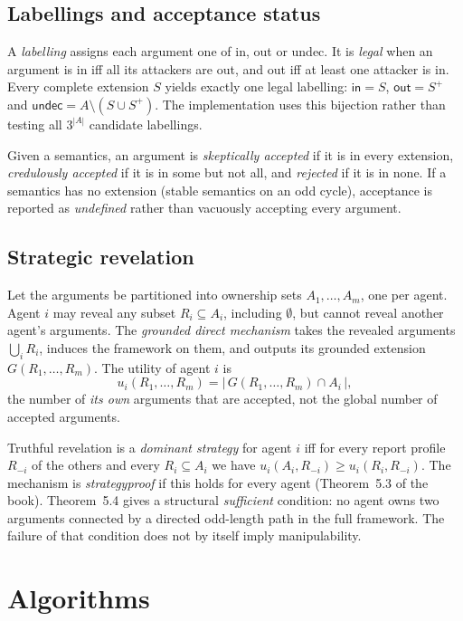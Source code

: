 \documentclass[11pt,a4paper]{article}
\begin{document}
\subsection{Labellings and acceptance status}
A \emph{labelling} assigns each argument one of \textsf{in}, \textsf{out} or \textsf{undec}. It is \emph{legal} when an argument is \textsf{in} iff all its attackers are \textsf{out}, and \textsf{out} iff at least one attacker is \textsf{in}. Every complete extension $S$ yields exactly one legal labelling: $\textsf{in}=S$, $\textsf{out}=S^{+}$ and $\textsf{undec}=A\setminus(S\cup S^{+})$. The implementation uses this bijection rather than testing all $3^{|A|}$ candidate labellings.

Given a semantics, an argument is \emph{skeptically accepted} if it is in every extension, \emph{credulously accepted} if it is in some but not all, and \emph{rejected} if it is in none. If a semantics has no extension (stable semantics on an odd cycle), acceptance is reported as \emph{undefined} rather than vacuously accepting every argument.

\subsection{Strategic revelation}
Let the arguments be partitioned into ownership sets $A_1,\dots,A_m$, one per agent. Agent $i$ may reveal any subset $R_i\subseteq A_i$, including $\emptyset$, but cannot reveal another agent's arguments. The \emph{grounded direct mechanism} takes the revealed arguments $\bigcup_i R_i$, induces the framework on them, and outputs its grounded extension $G(R_1,\dots,R_m)$. The utility of agent $i$ is
\[
u_i(R_1,\dots,R_m)=\bigl|\,G(R_1,\dots,R_m)\cap A_i\,\bigr|,
\]
the number of \emph{its own} arguments that are accepted, not the global number of accepted arguments.

Truthful revelation is a \emph{dominant strategy} for agent $i$ iff for every report profile $R_{-i}$ of the others and every $R_i\subseteq A_i$ we have $u_i(A_i,R_{-i})\ge u_i(R_i,R_{-i})$. The mechanism is \emph{strategyproof} if this holds for every agent (Theorem~5.3 of the book). Theorem~5.4 gives a structural \emph{sufficient} condition: no agent owns two arguments connected by a directed odd-length path in the full framework. The failure of that condition does not by itself imply manipulability.

\section{Algorithms}
\end{document}
